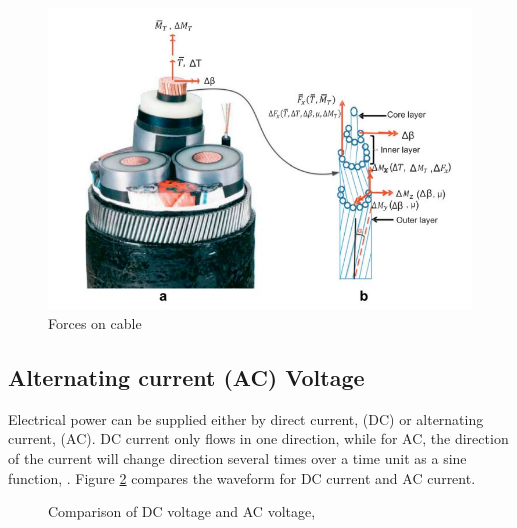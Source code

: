 \begin{figure}[H]
\centering
\includegraphics[scale=0.7]{figures/cable}
\caption[$\; \:$Forces on cable]{Forces on cable  \cite{Nasution2013} }
 \label{fig:cable}
\end{figure}

\subsection{Alternating current (AC) Voltage}
Electrical power can be supplied either by direct current, (DC) or alternating current, (AC). DC current only flows in one direction, while for AC, the direction of the current will change direction several times over a time unit as a sine function, \cite{Dale2000}. Figure \ref{fig:acdc} compares the waveform for DC current and AC current.


\begin{figure}[H]
\hfill
{}\hfill
\caption[$\; \:$Comparison of DC voltage and AC voltage]{Comparison of DC voltage and AC voltage, \cite{Dale2000}}
\label{fig:acdc}
\end{figure}

